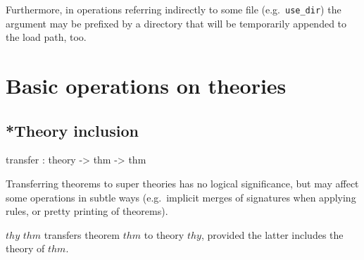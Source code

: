 Furthermore, in operations referring indirectly to some file (e.g.\ 
\texttt{use_dir}) the argument may be prefixed by a directory that will be
temporarily appended to the load path, too.


\section{Basic operations on theories}\label{BasicOperationsOnTheories}

\subsection{*Theory inclusion}
\begin{ttbox}
transfer    : theory -> thm -> thm
\end{ttbox}

Transferring theorems to super theories has no logical significance,
but may affect some operations in subtle ways (e.g.\ implicit merges
of signatures when applying rules, or pretty printing of theorems).

\begin{ttdescription}

\item[\ttindexbold{transfer} $thy$ $thm$] transfers theorem $thm$ to
  theory $thy$, provided the latter includes the theory of $thm$.
  
\end{ttdescription}


